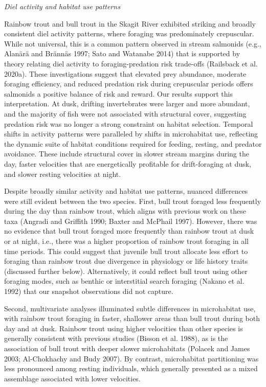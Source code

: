 \documentclass[]{article}
\begin{document}
\emph{Diel activity and habitat use patterns}

Rainbow trout and bull trout in the Skagit River exhibited striking and
broadly consistent diel activity patterns, where foraging was
predominately crepuscular. While not universal, this is a common pattern
observed in stream salmonids (e.g., Alanärä and Brännäs 1997; Sato and
Watanabe 2014) that is supported by theory relating diel activity to
foraging-predation risk trade-offs (Railsback et al. 2020a). These
investigations suggest that elevated prey abundance, moderate foraging
efficiency, and reduced predation risk during crepuscular periods offers
salmonids a positive balance of risk and reward. Our results support
this interpretation. At dusk, drifting invertebrates were larger and
more abundant, and the majority of fish were not associated with
structural cover, suggesting predation risk was no longer a strong
constraint on habitat selection. Temporal shifts in activity patterns
were paralleled by shifts in microhabitat use, reflecting the dynamic
suite of habitat conditions required for feeding, resting, and predator
avoidance. These include structural cover in slower stream margins
during the day, faster velocities that are energetically profitable for
drift-foraging at dusk, and slower resting velocities at night.

Despite broadly similar activity and habitat use patterns, nuanced
differences were still evident between the two species. First, bull
trout foraged less frequently during the day than rainbow trout, which
aligns with previous work on these taxa (Angradi and Griffith 1990;
Baxter and McPhail 1997). However, there was no evidence that bull trout
foraged more frequently than rainbow trout at dusk or at night, i.e.,
there was a higher proportion of rainbow trout foraging in all time
periods. This could suggest that juvenile bull trout allocate less
effort to foraging than rainbow trout due divergence in physiology or
life history traits (discussed further below). Alternatively, it could
reflect bull trout using other foraging modes, such as benthic or
interstitial search foraging (Nakano et al. 1992) that our snapshot
observations did not capture.

Second, multivariate analyses illuminated subtle differences in
microhabitat use, with rainbow trout foraging in faster, shallower areas
than bull trout during both day and at dusk. Rainbow trout using higher
velocities than other species is generally consistent with previous
studies (Bisson et al. 1988), as is the association of bull trout with
deeper slower microhabitats (Polacek and James 2003; Al-Chokhachy and
Budy 2007). By contrast, microhabitat partitioning was less pronounced
among resting individuals, which generally presented as a mixed
assemblage associated with lower velocities.
\end{document}
